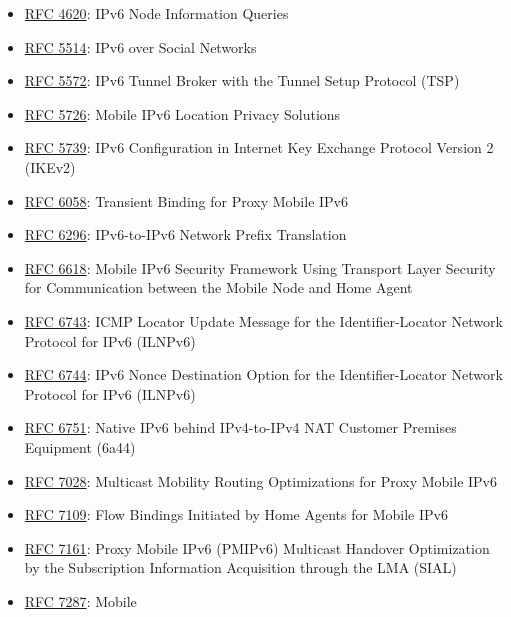 \documentclass[
]{article}
\providecommand{\tightlist}{%
  \setlength{\itemsep}{0pt}\setlength{\parskip}{0pt}}
\begin{document}
\begin{itemize}
\tightlist
\item
  \href{https://www.rfc-editor.org/info/rfc4620}{RFC 4620}: IPv6 Node
  Information Queries
\item
  \href{https://www.rfc-editor.org/info/rfc5514}{RFC 5514}: IPv6 over
  Social Networks
\item
  \href{https://www.rfc-editor.org/info/rfc5572}{RFC 5572}: IPv6 Tunnel
  Broker with the Tunnel Setup Protocol (TSP)
\item
  \href{https://www.rfc-editor.org/info/rfc5726}{RFC 5726}: Mobile IPv6
  Location Privacy Solutions
\item
  \href{https://www.rfc-editor.org/info/rfc5739}{RFC 5739}: IPv6
  Configuration in Internet Key Exchange Protocol Version 2 (IKEv2)
\item
  \href{https://www.rfc-editor.org/info/rfc6058}{RFC 6058}: Transient
  Binding for Proxy Mobile IPv6
\item
  \href{https://www.rfc-editor.org/info/rfc6296}{RFC 6296}: IPv6-to-IPv6
  Network Prefix Translation
\item
  \href{https://www.rfc-editor.org/info/rfc6618}{RFC 6618}: Mobile IPv6
  Security Framework Using Transport Layer Security for Communication
  between the Mobile Node and Home Agent
\item
  \href{https://www.rfc-editor.org/info/rfc6743}{RFC 6743}: ICMP Locator
  Update Message for the Identifier-Locator Network Protocol for IPv6
  (ILNPv6)
\item
  \href{https://www.rfc-editor.org/info/rfc6744}{RFC 6744}: IPv6 Nonce
  Destination Option for the Identifier-Locator Network Protocol for
  IPv6 (ILNPv6)
\item
  \href{https://www.rfc-editor.org/info/rfc6751}{RFC 6751}: Native IPv6
  behind IPv4-to-IPv4 NAT Customer Premises Equipment (6a44)
\item
  \href{https://www.rfc-editor.org/info/rfc7028}{RFC 7028}: Multicast
  Mobility Routing Optimizations for Proxy Mobile IPv6
\item
  \href{https://www.rfc-editor.org/info/rfc7109}{RFC 7109}: Flow
  Bindings Initiated by Home Agents for Mobile IPv6
\item
  \href{https://www.rfc-editor.org/info/rfc7161}{RFC 7161}: Proxy Mobile
  IPv6 (PMIPv6) Multicast Handover Optimization by the Subscription
  Information Acquisition through the LMA (SIAL)
\item
  \href{https://www.rfc-editor.org/info/rfc7287}{RFC 7287}: Mobile

\end{itemize}
\end{document}
